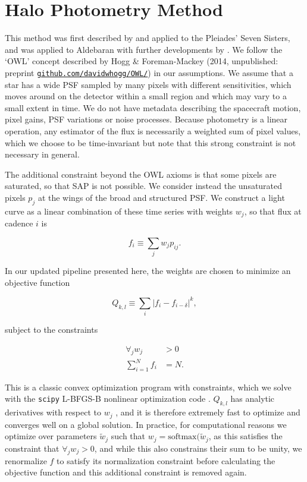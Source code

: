 \documentclass[modern]{aastex62}
\begin{document}
\section{Halo Photometry Method}
\label{method}


This method was first described by \citet{White2017} and applied to the Pleiades' Seven Sisters, and was applied to Aldebaran with further developments by \citet{Farr2018}. We follow the `OWL' concept described by Hogg \&  Foreman-Mackey (2014, unpublished: preprint  \href{https://github.com/davidwhogg/OWL/}{\nolinkurl{github.com/davidwhogg/OWL/}}) in our assumptions. We assume that a star has a wide PSF sampled by many pixels with different sensitivities, which moves around on the detector within a small region and which may vary to a small extent in time. We do not have metadata describing the spacecraft motion, pixel gains, PSF variations or noise processes. Because photometry is a linear operation, any estimator of the flux is necessarily a weighted sum of pixel values, which we choose to be time-invariant but note that this strong constraint is not necessary in general. 

The additional constraint beyond the OWL axioms is that some pixels are saturated, so that SAP is not possible. We consider instead the unsaturated pixels $p_j$ at the wings of the broad and structured PSF. We construct a light curve as a linear combination of these time series with weights $w_j$, so that flux at cadence $i$ is 

\begin{equation}
    f_i \equiv \sum_j {w_j p_{ij}}.
\end{equation}

\noindent In our updated pipeline presented here, the weights are chosen to minimize an objective function

\begin{equation}
    Q_{k,l} \equiv {\sum_i{|f_i - f_{i-\delta}|^k}},
\end{equation}

\noindent subject to the constraints 

\begin{align}
\forall_j w_j &> 0\\
\sum_{i=1}^{N} f_i  &= N.
\end{align}

This is a classic convex optimization program with constraints, which we solve with the \texttt{scipy} \citep{scipy} L-BFGS-B nonlinear optimization code \citep{lbfgsb}. $Q_{k,l}$ has analytic derivatives with respect to $w_j$ \citep[calculated with \texttt{autograd};][]{autograd}, and it is therefore extremely fast to optimize and converges well on a global solution. In practice, for computational reasons we optimize over parameters $\tilde{w}_j$ such that $w_j = \text{softmax}(\tilde{w}_j$, as this satisfies the constraint that $\forall_j w_j > 0$, and while this also constrains their sum to be unity, we renormalize $f$ to satisfy its normalization constraint before calculating the objective function and this additional constraint is removed again.
\end{document}
